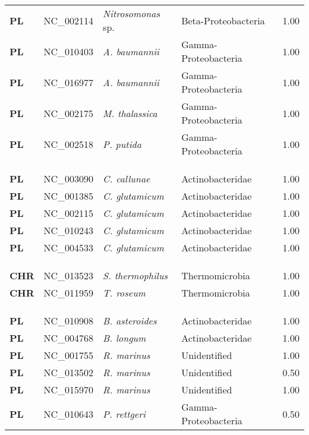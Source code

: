 \begin{adjustwidth}{-3cm}{2cm}
{\begin{supertabular}{>{\bfseries}l|p{0.1\textwidth}p{0.14\textwidth}l|l}
PL & NC\_002114 & \textit{Nitrosomonas} sp. & Beta-Proteobacteria & 1.00\\
PL & NC\_010403 & \textit{A. baumannii} & Gamma-Proteobacteria & 1.00\\
PL & NC\_016977 & \textit{A. baumannii} & Gamma-Proteobacteria & 1.00\\
PL & NC\_002175 & \textit{M. thalassica} & Gamma-Proteobacteria & 1.00\\
PL & NC\_002518 & \textit{P. putida} & Gamma-Proteobacteria & 1.00\\
\\
\\
\hline\\
PL & NC\_003090 & \textit{C. callunae} & Actinobacteridae & 1.00\\
PL & NC\_001385 & \textit{C. glutamicum} & Actinobacteridae & 1.00\\
PL & NC\_002115 & \textit{C. glutamicum} & Actinobacteridae & 1.00\\
PL & NC\_010243 & \textit{C. glutamicum} & Actinobacteridae & 1.00\\
PL & NC\_004533 & \textit{C. glutamicum} & Actinobacteridae & 1.00\\
\\
\\
\hline\\
CHR & NC\_013523 & \textit{S. thermophilus} & Thermomicrobia & 1.00\\
CHR & NC\_011959 & \textit{T. roseum} & Thermomicrobia & 1.00\\
\\
\\
\hline\\
PL & NC\_010908 & \textit{B. asteroides} & Actinobacteridae & 1.00\\
PL & NC\_004768 & \textit{B. longum} & Actinobacteridae & 1.00\\
PL & NC\_001755 & \textit{R. marinus} & Unidentified & 1.00\\
PL & NC\_013502 & \textit{R. marinus} & Unidentified & 0.50\\
PL & NC\_015970 & \textit{R. marinus} & Unidentified & 1.00\\
PL & NC\_010643 & \textit{P. rettgeri} & Gamma-Proteobacteria & 0.50\\

\end{supertabular}}
\end{adjustwidth}
